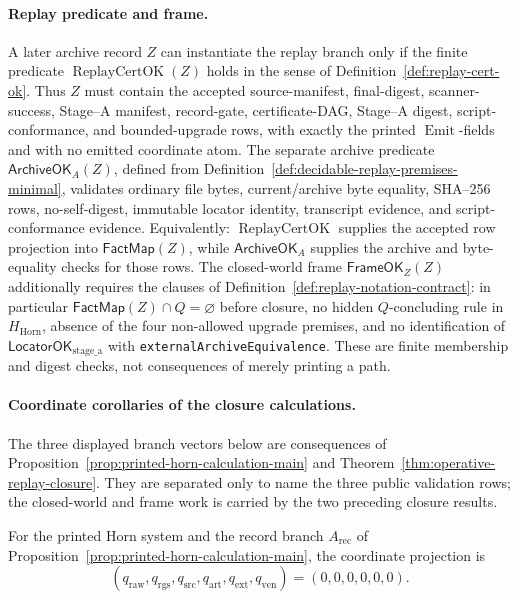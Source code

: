 \documentclass[runningheads]{llncs}
\newcommand{\LocatorOKstageA}{\mathsf{LocatorOK}_{\mathrm{stage\_a}}}
\newcommand{\ArchiveOKA}{\mathsf{ArchiveOK}_{A}}
\newcommand{\FactMap}{\mathsf{FactMap}}
\newcommand{\FrameOKZ}{\mathsf{FrameOK}_{Z}}
\newcommand{\rawBeginTokenCoord}{q_{\mathrm{raw}}}
\newcommand{\qlex}{\rawBeginTokenCoord}
\newcommand{\qrgs}{q_{\mathrm{rgs}}}
\newcommand{\qsrc}{q_{\mathrm{src}}}
\newcommand{\qart}{q_{\mathrm{art}}}
\newcommand{\qext}{q_{\mathrm{ext}}}
\newcommand{\qven}{q_{\mathrm{ven}}}
\newcommand{\HHorn}{H_{\mathrm{Horn}}}
\begin{document}
\paragraph{Replay predicate and frame.}
A later archive record \(Z\) can instantiate the replay branch only if the
finite predicate \(\operatorname{ReplayCertOK}(Z)\) holds in the sense of
Definition~\ref{def:replay-cert-ok}.  Thus \(Z\) must contain the accepted
source-manifest, final-digest, scanner-success, Stage--A manifest, record-gate,
certificate-DAG, Stage--A digest, script-conformance, and bounded-upgrade rows,
with exactly the printed \(\operatorname{Emit}\)-fields and with no emitted
coordinate atom.  The separate archive predicate \(\ArchiveOKA(Z)\), defined
from Definition~\ref{def:decidable-replay-premises-minimal}, validates ordinary
file bytes, current/archive byte equality, SHA--256 rows, no-self-digest,
immutable locator identity, transcript evidence, and script-conformance
evidence.  Equivalently: \(\operatorname{ReplayCertOK}\) supplies the accepted
row projection into \(\FactMap(Z)\), while \(\ArchiveOKA\) supplies the archive
and byte-equality checks for those rows.  The closed-world frame
\(\FrameOKZ(Z)\) additionally requires the
clauses of Definition~\ref{def:replay-notation-contract}: in particular
\(\FactMap(Z)\cap Q=\varnothing\) before closure, no hidden
\(Q\)-concluding rule in \(\HHorn\), absence of the four non-allowed upgrade
premises, and no
identification of \(\LocatorOKstageA\) with
\texttt{externalArchiveEquivalence}.  These are finite membership and digest
checks, not consequences of merely printing a path.

\paragraph{Coordinate corollaries of the closure calculations.}
The three displayed branch vectors below are consequences of
Proposition~\ref{prop:printed-horn-calculation-main} and
Theorem~\ref{thm:operative-replay-closure}.  They are separated only to name the
three public validation rows; the closed-world and frame work is carried by the
two preceding closure results.

\begin{corollary}
\label{prop:coordinate-statement-pdf-base}
For the printed Horn system and the record branch \(A_{\mathrm{rec}}\) of
Proposition~\ref{prop:printed-horn-calculation-main}, the coordinate projection
is
\[
(\qlex,\qrgs,\qsrc,\qart,\qext,\qven)=(0,0,0,0,0,0).
\]
\end{corollary}
\end{document}
